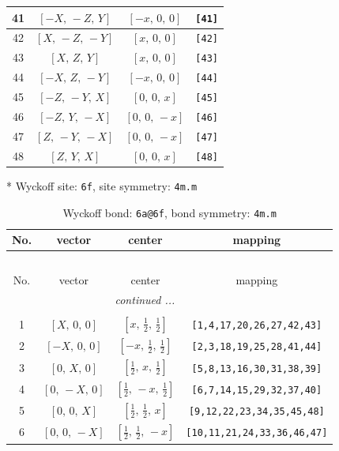 \documentclass[fleqn,8pt]{jsarticle}
\begin{document}
\begin{longtable}{cccc}
41 & $\left[ - X,\, - Z,\, Y \right]$ & $\left[ - x,\, 0,\, 0 \right]$ & {\tt [41]} \\ \hline
42 & $\left[ X,\, - Z,\, - Y \right]$ & $\left[ x,\, 0,\, 0 \right]$ & {\tt [42]} \\ \hline
43 & $\left[ X,\, Z,\, Y \right]$ & $\left[ x,\, 0,\, 0 \right]$ & {\tt [43]} \\ \hline
44 & $\left[ - X,\, Z,\, - Y \right]$ & $\left[ - x,\, 0,\, 0 \right]$ & {\tt [44]} \\ \hline
45 & $\left[ - Z,\, - Y,\, X \right]$ & $\left[ 0,\, 0,\, x \right]$ & {\tt [45]} \\ \hline
46 & $\left[ - Z,\, Y,\, - X \right]$ & $\left[ 0,\, 0,\, - x \right]$ & {\tt [46]} \\ \hline
47 & $\left[ Z,\, - Y,\, - X \right]$ & $\left[ 0,\, 0,\, - x \right]$ & {\tt [47]} \\ \hline
48 & $\left[ Z,\, Y,\, X \right]$ & $\left[ 0,\, 0,\, x \right]$ & {\tt [48]} \\
\end{longtable}
* Wyckoff site: {\tt 6f}, site symmetry: {\tt 4m.m}
\renewcommand{\arraystretch}{1.2}
\begin{longtable}{cccc}
\caption{Wyckoff bond: {\tt 6a@6f}, bond symmetry: {\tt 4m.m}}
 \\
 \hline \hline
No. & vector & center & mapping \\ \hline \endfirsthead

\multicolumn{3}{l}{\tablename\ \thetable{}} \\
 \hline \hline
No. & vector & center & mapping \\ \hline \endhead

 \hline \hline
\multicolumn{3}{r}{\footnotesize\it continued ...} \\ \endfoot

 \hline \hline
\multicolumn{3}{r}{} \\ \endlastfoot

1 & $\left[ X,\, 0,\, 0 \right]$ & $\left[ x,\, \frac{1}{2},\, \frac{1}{2} \right]$ & {\tt [1,4,17,20,26,27,42,43]} \\ \hline
2 & $\left[ - X,\, 0,\, 0 \right]$ & $\left[ - x,\, \frac{1}{2},\, \frac{1}{2} \right]$ & {\tt [2,3,18,19,25,28,41,44]} \\ \hline
3 & $\left[ 0,\, X,\, 0 \right]$ & $\left[ \frac{1}{2},\, x,\, \frac{1}{2} \right]$ & {\tt [5,8,13,16,30,31,38,39]} \\ \hline
4 & $\left[ 0,\, - X,\, 0 \right]$ & $\left[ \frac{1}{2},\, - x,\, \frac{1}{2} \right]$ & {\tt [6,7,14,15,29,32,37,40]} \\ \hline
5 & $\left[ 0,\, 0,\, X \right]$ & $\left[ \frac{1}{2},\, \frac{1}{2},\, x \right]$ & {\tt [9,12,22,23,34,35,45,48]} \\ \hline
6 & $\left[ 0,\, 0,\, - X \right]$ & $\left[ \frac{1}{2},\, \frac{1}{2},\, - x \right]$ & {\tt [10,11,21,24,33,36,46,47]} \\
\end{longtable}
\end{document}
